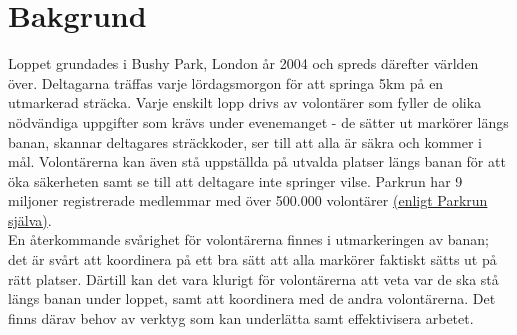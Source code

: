 \section{Bakgrund}


Loppet grundades i Bushy Park, London år 2004 och spreds därefter världen över. Deltagarna träffas varje lördagsmorgon för att springa 5km på en utmarkerad sträcka. Varje enskilt lopp drivs av volontärer som fyller de olika nödvändiga uppgifter som krävs under evenemanget - de sätter ut markörer längs banan, skannar deltagares sträckkoder, ser till att alla är säkra och kommer i mål. Volontärerna kan även stå uppställda på utvalda platser längs banan för att öka säkerheten samt se till att deltagare inte springer vilse. Parkrun har 9 miljoner registrerade medlemmar med över 500.000 volontärer \href{https://www.parkrun.com/about/}{(enligt Parkrun själva)}. \\
En återkommande svårighet för volontärerna finnes i utmarkeringen av banan; det är svårt att koordinera på ett bra sätt att alla markörer faktiskt sätts ut på rätt platser. Därtill kan det vara klurigt för volontärerna att veta var de ska stå längs banan under loppet, samt att koordinera med de andra volontärerna. Det finns därav behov av verktyg som kan underlätta samt effektivisera arbetet.

